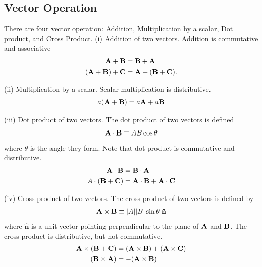 \documentclass[../main.tex]{subfiles}
\begin{document}
\subsection*{Vector Operation}
There are four vector operation: Addition,  Multiplication by a scalar, Dot product, and Cross Product.
(i) Addition of two vectors. Addition is commutative and associative
\begin{align*}
    \mathbf{A}+\mathbf{B}&=\mathbf{B}+\mathbf{A}\\
    (\mathbf{A }+ \mathbf{B}) +\mathbf{ C}& = \mathbf{A }+ (\mathbf{B} + \mathbf{C}).
\end{align*}

(ii) Multiplication by a scalar. Scalar multiplication is distributive.
\begin{align*}
    a(\mathbf{A} + \mathbf{\mathbf{B}}) = a\mathbf{A} + a\mathbf{B}
\end{align*}

(iii) Dot product of two vectors. The dot product of two vectors is defined 
\begin{align*}
    \mathbf{A} \cdot \mathbf{B} \equiv AB \cos \theta
\end{align*}
where $\theta$ is the angle they form. Note that dot product is commutative and distributive.
\begin{align*}
    \mathbf{A} \cdot \mathbf{B} &= \mathbf{B} \cdot \mathbf{A}\\
    A \cdot (\mathbf{B} + \mathbf{C}) &= \mathbf{A} \cdot \mathbf{B} + \mathbf{A} \cdot \mathbf{C}
\end{align*}

(iv) Cross product of two vectors. The cross product of two vectors is defined by
\begin{align*}
    \mathbf{A} \times \mathbf{B} \equiv |A||B| \sin \theta\;\mathbf{ \hat{n}}
\end{align*}
where $\mathbf{\hat{n}}$ is a unit vector pointing perpendicular to the plane of $\mathbf{A}$ and $\mathbf{B}$.  The cross product is distributive, but not commutative.
\begin{align*}
    \mathbf{A} \times (\mathbf{B} + \mathbf{C}) &= (\mathbf{A} \times \mathbf{B}) + (\mathbf{A} \times \mathbf{C})\\
    (\mathbf{B} \times \mathbf{A}) &= -(\mathbf{A} \times \mathbf{B})
\end{align*}
\end{document}
